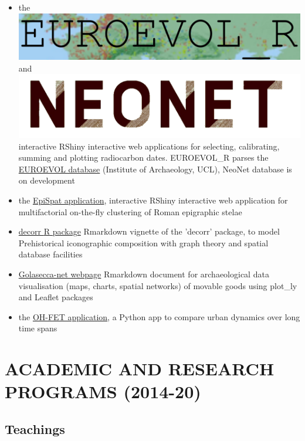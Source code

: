 \documentclass[11pt]{report} %
\begin{document}
\begin{itemize}
 \item the \href{https://neolithic.shinyapps.io/Euroevol\_R/}{\includegraphics[scale=0.20]{"euroevol_R"}} and \href{https://neolithic.shinyapps.io/neonet/}{\includegraphics[scale=0.04]{"neonet"}} interactive RShiny interactive web applications for selecting, calibrating, summing and plotting radiocarbon dates. EUROEVOL\_R parses the \href{http://discovery.ucl.ac.uk/1469811/}{EUROEVOL database} (Institute of Archaeology, UCL), NeoNet database is on development
  \item the \href{https://epispat.shinyapps.io/analyses_mult_5/}{EpiSpat application}, interactive RShiny interactive web application for multifactorial on-the-fly clustering of Roman epigraphic stelae
  \item \href{https://zoometh.github.io/iconr/docs/}{decorr \textsf{R} package} Rmarkdown vignette of the 'decorr' package, to model Prehistorical iconographic composition with graph theory and spatial database facilities
\item \href{https://zoometh.github.io/golasecca/}{Golasecca-net webpage} Rmarkdown document for archaeological data visualisation (maps, charts, spatial networks) of movable goods using plot\_ly and Leaflet packages
  \item the \href{https://www.oxbowbooks.com/dbbc/caa2014-21st-century-archaeology.html/}{OH-FET application}, a \textsf{Python} app to compare urban dynamics over long time spans
\end{itemize}


\section*{ACADEMIC AND RESEARCH PROGRAMS (2014-20)}

\subsection*{Teachings}
\end{document}
